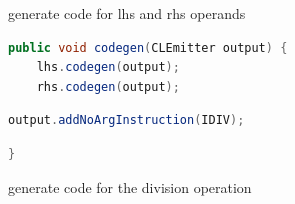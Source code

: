 \documentclass[8pt,a4paper,compress]{beamer}
\begin{document}
\begin{frame}[fragile]
\begin{overprint}
\begin{tcolorbox}[enhanced,drop shadow southwest,sharp corners,size=fbox,colback=white,fontlower=\small\ttfamily,collower=silver900]
\tcblower
\begin{minipage}[t][.2cm][t]{\textwidth}
generate code for lhs and rhs operands
\end{minipage}
\end{tcolorbox}

\begin{tcolorbox}[enhanced,drop shadow southwest,sharp corners,size=fbox,colback=white,fontlower=\small\ttfamily,collower=silver900]

\begin{lstlisting}[language=Java,style=focusout]
public void codegen(CLEmitter output) {
    lhs.codegen(output);
    rhs.codegen(output);
\end{lstlisting}
\begin{lstlisting}[language=Java,style=focusin,backgroundcolor=\color{lime100}]
    output.addNoArgInstruction(IDIV);
\end{lstlisting}
\begin{lstlisting}[language=Java,style=focusout]
}
\end{lstlisting}

\tcblower
\begin{minipage}[t][.2cm][t]{\textwidth}
generate code for the division operation
\end{minipage}
\end{tcolorbox}

\end{overprint}
\end{frame}
\end{document}
